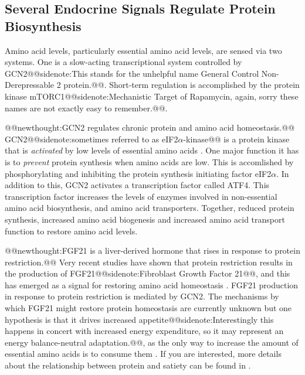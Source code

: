 \documentclass{tufte-handout}
\makeatletter
\def\newthought#1{@@newthought:#1@@}
\def\sidenote#1{@@sidenote:#1@@}
\makeatother
\begin{document}
\subsection{Several Endocrine Signals Regulate Protein Biosynthesis}

Amino acid levels, particularly essential amino acid levels, are sensed via two systems.  One is a slow-acting transcriptional system controlled by GCN2\sidenote{This stands for the unhelpful name General Control Non-Derepressable 2 protein.}.  Short-term regulation is accomplished by the protein kinase mTORC1\sidenote{Mechanistic Target of Rapamycin, again, sorry these names are not exactly easy to remember.}.

\newthought{GCN2 regulates chronic protein and amino acid homeostasis.}  GCN2\sidenote{sometimes referred to as eIF2$\alpha$-kinase} is a protein kinase that is \emph{activated} by low levels of essential amino acids \citep{Castilho2014}.  One major function it has is to \emph{prevent} protein synthesis when amino acids are low.  This is accomlished by phosphorylating and inhibiting the protein synthesis initiating factor eIF2$\alpha$.  In addition to this, GCN2 activates a transcription factor called ATF4.  This transcription factor increases the levels of enzymes involved in non-essential amino acid biosynthesis, and amino acid transporters.  Together, reduced protein synthesis, increased amino acid biogenesis and increased amino acid transport function to restore amino acid levels.  

\newthought{FGF21 is a liver-derived hormone that rises in response to protein restriction.}  Very recent studies have shown that protein restriction results in the production of FGF21\sidenote{Fibroblast Growth Factor 21}, and this has emerged as a signal for restoring amino acid homeostasis \citep{Laeger2014}.  FGF21 production in response to protein restriction is mediated by GCN2.  The mechanisms by which FGF21 might restore protein homeostasis are currently unknown but one hypothesis is that it drives increased appetite\sidenote{Interestingly this happens in concert with increased energy expenditure, so it may represent an energy balance-neutral adaptation.}, as the only way to increase the amount of essential amino acids is to consume them \citep{Solon-Biet2016a}.  If you are interested, more details about the relationship between protein and satiety can be found in \citet{Morrison2015}.
\end{document}

